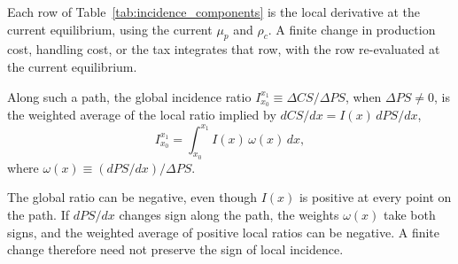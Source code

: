 \documentclass[11pt]{article}
\begin{document}
Each row of Table~\ref{tab:incidence_components} is the local derivative at
the current equilibrium, using the current $\mu_p$ and $\rho_c$. A finite
change in production cost, handling cost, or the tax integrates that row,
with the row re-evaluated at the current equilibrium.

Along such a path, the global incidence ratio
$I_{x_0}^{x_1}\equiv \Delta CS/\Delta PS$, when $\Delta PS\neq 0$, is the
weighted average of the local ratio implied by $dCS/dx = I(x)\,dPS/dx$,
\begin{equation}
I_{x_0}^{x_1} = \int_{x_0}^{x_1} I(x)\,\omega(x)\,dx,
\label{eq:global-incidence-final}
\end{equation}
where $\omega(x)\equiv (dPS/dx)/\Delta PS$.

The global ratio can be negative, even though $I(x)$ is positive at every
point on the path. If $dPS/dx$ changes sign along the path, the weights
$\omega(x)$ take both signs, and the weighted average of positive local
ratios can be negative. A finite change therefore need not preserve the
sign of local incidence.



\end{document}
